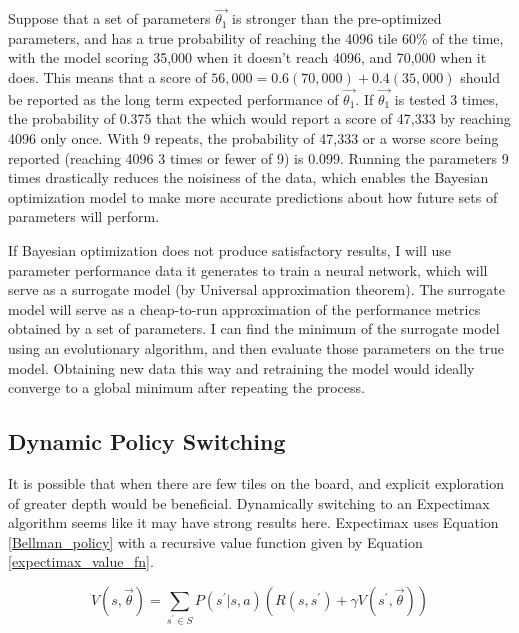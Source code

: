 \documentclass{article}
\begin{document}
Suppose that a set of parameters $\vec{\theta_1}$ is stronger than the pre-optimized parameters, and has a true probability of reaching the 4096 tile 60\% of the time, with the model scoring 35,000 when it doesn't reach 4096, and 70,000 when it does.  This means that a score of $56,000 = 0.6(70,000) + 0.4(35,000)$ should be reported as the long term expected performance of $\vec{\theta_1}$.  If $\vec{\theta_1}$ is tested 3 times, the probability of 0.375 that the which would report a score of 47,333 by reaching 4096 only once.   With 9 repeats, the probability of 47,333 or a worse score being reported (reaching 4096 3 times or fewer of 9) is 0.099.  Running the parameters 9 times drastically reduces the noisiness of the data, which enables the Bayesian optimization model to make more accurate predictions about how future sets of parameters will perform.
\\


If Bayesian optimization does not produce satisfactory results, I will use parameter performance data it generates to train a neural network, which will serve as a surrogate model (by Universal approximation theorem).  The surrogate model will serve as a cheap-to-run approximation of the performance metrics obtained by a set of parameters.  I can find the minimum of the surrogate model using an evolutionary algorithm, and then evaluate those parameters on the true model.  Obtaining new data this way and retraining the model would ideally converge to a global minimum after repeating the process.

\subsection{Dynamic Policy Switching}
It is possible that when there are few tiles on the board, and explicit exploration of greater depth would be beneficial.  Dynamically switching to an Expectimax algorithm seems like it may have strong results here.  Expectimax uses Equation \ref{Bellman_policy} with a recursive value function given by Equation  \ref{expectimax_value_fn}.

\begin{equation}
\label{expectimax_value_fn}
V(s, \vec{\theta}) = \sum_{s^\prime \in S} P(s^\prime|s, a)(R(s, s^\prime) + \gamma V(s^\prime, \vec{\theta}))
\end{equation}
\end{document}
